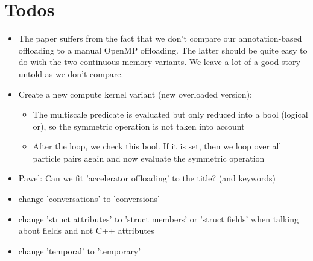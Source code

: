 \section*{Todos}

\begin{itemize} 
  \item The paper suffers from the fact that we don't compare our annotation-based offloading to a manual OpenMP offloading. The latter should be quite easy to do with the two continuous memory variants. We leave a lot of a good story untold as we don't compare.
  
  \item Create a new compute kernel variant (new overloaded version):
    \begin{itemize}
      \item The multiscale predicate is evaluated but only reduced into a bool (logical or), so the symmetric operation is not taken into account
      \item After the loop, we check this bool. If it is set, then we loop over all particle pairs again and now evaluate the symmetric operation
    \end{itemize}

    \item Pawel: Can we fit 'accelerator offloading' to the title? (and keywords)

    \item change 'conversations' to 'conversions'
    \item change 'struct attributes' to 'struct members' or 'struct fields' when talking about fields and not C++ attributes
    \item change 'temporal' to 'temporary'

\end{itemize}
